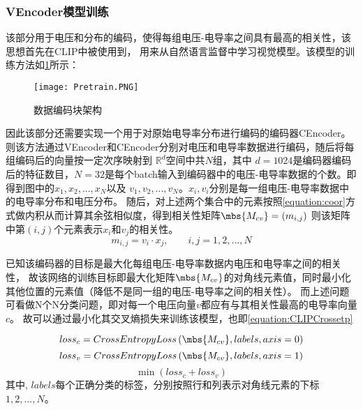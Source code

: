\subsubsection{VEncoder模型训练}

该部分用于电压和分布的编码，使得每组电压-电导率之间具有最高的相关性，该思想首先在CLIP中被使用到\cite{CLIP}，
用来从自然语言监督中学习视觉模型。该模型的训练方法如\cref{figure:Pretrain}所示：

\begin{figure}[H]
    \centering
    \texttt{[image: Pretrain.PNG]}
    \caption{数据编码块架构}
    \label{figure:Pretrain}
\end{figure}
因此该部分还需要实现一个用于对原始电导率分布进行编码的编码器CEncoder。
则该方法通过VEncoder和CEncoder分别对电压和电导率数据进行编码，随后将每组编码后的向量按一定次序映射到 $\mathbb{R}^d$空间中共$N$组，其中
$d=1024$是编码器编码后的特征数目，$N=32$是每个batch输入到编码器中的电压-电导率数据的个数。即得到图中的$x_1, x_2,...,x_N$以及
$v_1, v_2,..., v_N$。$x_i,v_i$分别是每一组电压-电导率数据中的电导率分布和电压分布。
随后，对上述两个集合中的元素按照\cref{equation:coor}方式做内积从而计算其余弦相似度，得到相关性矩阵$\mbs{M_{cv}}= \left(m_{i,j}\right)$
则该矩阵中第$(i,j)$个元素表示$x_i$和$v_j$的相关性。
\begin{equation}
    \label{equation:coor}
    m_{i,j} = v_{i} \cdot x_{j}, \qquad i,j=1,2,...,N
\end{equation}


已知该编码器的目标是最大化每组电压-电导率数据内电压和电导率之间的相关性，
故该网络的训练目标即最大化矩阵$\mbs{M_{cv}}$的对角线元素值，同时最小化其他位置的元素值（降低不是同一组的电压-电导率之间的相关性）。
而上述问题可看做N个N分类问题，即对每一个电压向量$v$都应有与其相关性最高的电导率向量$c$。
故可以通过最小化其交叉熵损失来训练该模型，也即\cref{equation:CLIPCrossetp}

\begin{equation}
    loss_c = CrossEntropyLoss \left(\mbs{M_{cv}}, labels, axis=0\right)
\end{equation}
\begin{equation}
    loss_v = CrossEntropyLoss \left(\mbs{M_{cv}}, labels, axis=1\right)
\end{equation}
\begin{equation}
    \label{equation:CLIPCrossetp}
    \min \left(loss_c + loss_v\right)
\end{equation}
其中, $labels$每个正确分类的标签，分别按照行和列表示对角线元素的下标$1,2,...,N$。

